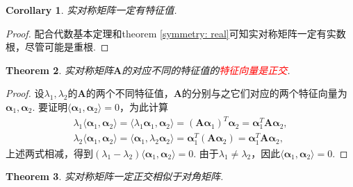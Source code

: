 \documentclass{article}
\newtheorem{theorem}{Theorem}[section]
\newtheorem{corollary}[theorem]{Corollary}
\newcommand{\mbf}[1]{\bm{#1}}
\newcommand\inp[2]{\langle #1, #2 \rangle} %
\newcommand{\redt}[1]{\textcolor{red}{#1}}
\begin{document}
\begin{corollary}\label{symmetry: real2}
\rm 实对称矩阵一定有特征值.
\end{corollary}

\begin{proof}
\rm 配合代数基本定理和theorem \ref{symmetry: real}可知实对称矩阵一定有实数根，尽管可能是重根.
\end{proof}


\begin{theorem}\label{symmetry: theorem1}
\rm 实对称矩阵$\mbf{A}$的对应不同的特征值的\redt{特征向量是正交}.
\end{theorem}

\begin{proof}
设$\lambda_1,\lambda_2$的$\mbf{A}$的两个不同特征值，$\mbf{A}$的分别与之它们对应的两个特征向量为$\mbf{\alpha}_1,\mbf{\alpha}_2$. 要证明$\inp{\mbf{\alpha}_1}{\mbf{\alpha}_2}=0$，为此计算
$$
\begin{array}{ll}
\lambda_1\inp{\mbf{\alpha}_1}{\mbf{\alpha}_2} = \inp{\lambda_1\mbf{\alpha}_1}{\mbf{\alpha}_2} = (\mbf{A}\mbf{\alpha}_1)^T\mbf{\alpha}_2 = \mbf{\alpha}_1^T\mbf{A}\mbf{\alpha}_2, \\
 \lambda_2\inp{\mbf{\alpha}_1}{\mbf{\alpha}_2} = \inp{\mbf{\alpha}_1}{\lambda_2\mbf{\alpha}_2}= \mbf{\alpha}_1^T(\mbf{A}\mbf{\alpha}_2) = \mbf{\alpha}_1^T\mbf{A}\mbf{\alpha}_2,
\end{array}
$$
上述两式相减，得到$(\lambda_1-\lambda_2)\inp{\mbf{\alpha}_1}{\mbf{\alpha}_2}=0$. 由于$\lambda_1 \neq \lambda_2$，因此$\inp{\mbf{\alpha}_1}{\mbf{\alpha}_2} = 0$.
\end{proof}

\begin{theorem}\label{symmetry: theorem2}
\rm 实对称矩阵一定正交相似于对角矩阵.
\end{theorem}
\end{document}
